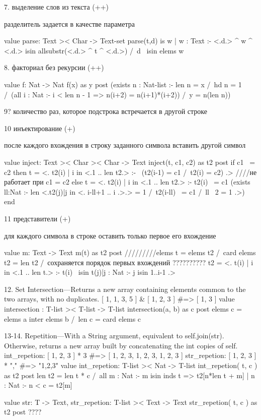 \documentclass[14pt, twoside]{extreport}
\begin{document}
{7. выделение слов из текста (++)

разделитель задается в качестве параметра

value parse: Text >< Char -> Text-set
parse(t,d) is { w | w : Text :-
<.d.> ^ w ^ <.d.> isin allsubstr(<.d.> ^ t ^ <.d.>) /\ d ~isin elems w }

8. факториал без рекурсии (++)

value f: Nat -> Nat
f(x) as y
post
(exists n : Nat-list :- len n = x /\ hd n = 1 /\
(all i : Nat :- i < len n - 1 => n(i+2) = n(i+1)*(i+2)) /\ y = n(len n))

9? количество раз, которое подстрока встречается в другой строке

10 инъектирование (+)

после каждого вхождения в строку заданного символа вставить другой символ

value inject: Text >< Char >< Char -> Text
inject(t, c1, c2) as t2
post
if c1 ~= c2 then t = <. t2(i) | i in <.1 .. len t2.> :- ~(t2(i-1) = c1 /\ t2(i) = c2) .>  ////не работает при c1 = c2
else t = <. t2(i) | i in <.1 .. len t2.> :- t2(i) ~= c1 \/ (exists ll:Nat :- len <.t2(j)|j in <. i-ll+1 .. i .>.> = 1 /\ t2(i-ll) ~= c1 /\ ll \ 2 = 1 .>) end


11 представители (+)

для каждого символа в строке оставить только первое его вхождение

value m: Text -> Text
m(t) as t2
post
/////////elems t = elems t2 /\ card elems t2 = len t2 /\ сохраняется порядок первых вхождений ??????????
t2 = <. t(i) | i in <.1 .. len t.> :- t(i) ~isin {t(j)|j : Nat :- j isin {1..i-1}} .>

12. Set Intersection—Returns a new array containing elements common to the two arrays, with no duplicates.
[ 1, 1, 3, 5 ] & [ 1, 2, 3 ] #=> [ 1, 3 ]
value intersection : T-list >< T-list -> T-list
intersection(a, b) as c
post elems c = elems a inter elems b /\ len c = card elems c

13-14. Repetition—With a String argument, equivalent to self.join(str). Otherwise, returns a new array built by concatenating the int copies of self.
int_repetion: [ 1, 2, 3 ] * 3 #=> [ 1, 2, 3, 1, 2, 3, 1, 2, 3 ]
str_repetion: [ 1, 2, 3 ] * "," #=> "1,2,3"
value int_repetion: T-list >< Nat -> T-list
int_repetion( t, c ) as t2
post len t2 = len t * c /\ all m : Nat :- m isin inds t  => { t2[n*len t + m] | n : Nat :- n < c } = { t2[m] }

value str: T -> Text,
str_repetion: T-list >< Text -> Text
str_repetion( t, c ) as t2
post  ????

}
\end{document}

